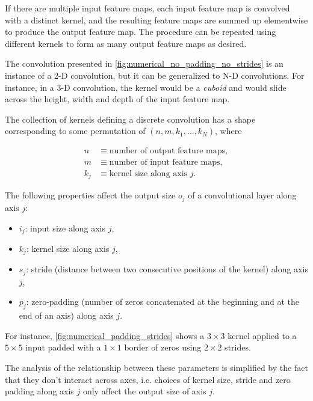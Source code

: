 \documentclass{report}
\begin{document}
If there are multiple input feature maps, each input feature map is convolved
with a distinct kernel, and the resulting feature maps are summed up elementwise
to produce the output feature map. The procedure can be repeated using different
kernels to form as many output feature maps as desired.

The convolution presented in \autoref{fig:numerical_no_padding_no_strides} is an
instance of a 2-D convolution, but it can be generalized to N-D convolutions.
For instance, in a 3-D convolution, the kernel would be a {\em cuboid} and would
slide across the height, width and depth of the input feature map.

The collection of kernels defining a discrete convolution has a shape
corresponding to some permutation of $(n, m, k_1, \ldots, k_N)$, where

\begin{equation}
\begin{split}
    n &\equiv \text{number of output feature maps},\\
    m &\equiv \text{number of input feature maps},\\
    k_j &\equiv \text{kernel size along axis $j$}.
\end{split}
\end{equation}

The following properties affect the output size $o_j$ of a convolutional layer
along axis $j$:

\begin{itemize}
    \item $i_j$: input size along axis $j$,
    \item $k_j$: kernel size along axis $j$,
    \item $s_j$: stride (distance between two consecutive positions of the
        kernel) along axis $j$,
    \item $p_j$: zero-padding (number of zeros concatenated at the beginning and
        at the end of an axis) along axis $j$.
\end{itemize}

For instance, \autoref{fig:numerical_padding_strides} shows a $3 \times 3$
kernel applied to a $5 \times 5$ input padded with a $1 \times 1$ border of
zeros using $2 \times 2$ strides.

The analysis of the relationship between these parameters is simplified by the
fact that they don't interact across axes, i.e. choices of kernel size, stride
and zero padding along axis $j$ only affect the output size of axis $j$.
\end{document}
